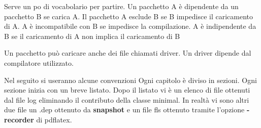   Serve un po di vocabolario per partire. Un pacchetto A è dipendente da un pacchetto B se carica A. Il pacchetto A esclude B se B impedisce il caricamento di A.   A è incompatibile con B se impedisce la compilazione. A è indipendente da B se il caricamento di A non implica il caricamento di B


Un pacchetto può caricare anche dei file chiamati driver. Un driver dipende dal compilatore utilizzato.


Nel seguito si useranno alcune convenzioni 
Ogni capitolo è diviso in sezioni. Ogni sezione inizia con un breve listato. Dopo il listato vi è un elenco di file ottenuti dal file log eliminando il contributo della classe minimal. In realtà  vi sono altri due file un .dep ottenuto da \textbf{snapshot} e un file fls ottenuto tramite l'opzione  \textbf{-recorder}  di pdflatex.   




